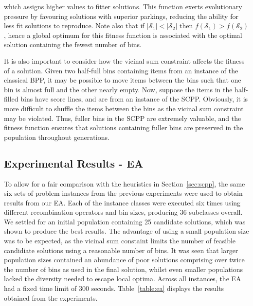 \documentclass[authoryear]{elsarticle}
\begin{document}
\noindent which assigns higher values to fitter solutions. This function exerts evolutionary pressure by favouring solutions with superior parkings, reducing the ability for less fit solutions to reproduce. Note also that if $|\mathcal{S}_1| < |\mathcal{S}_2|$  then $f(\mathcal{S}_1) > f(\mathcal{S}_2)$, hence a global optimum for this fitness function is associated with the optimal solution containing the fewest number of bins.

It is also important to consider how the vicinal sum constraint affects the fitness of a solution. Given two half-full bins containing items from an instance of the classical BPP, it may be possible to move items between the bins such that one bin is almost full and the other nearly empty. Now, suppose the items in the half-filled bins have score lines, and are from an instance of the SCPP. Obviously, it is more difficult to shuffle the items between the bins as the vicinal sum constraint may be violated. Thus, fuller bins in the SCPP are extremely valuable, and the fitness function ensures that solutions containing fuller bins are preserved in the population throughout generations.


\subsection{Experimental Results - EA}
\label{sub:expea}
\noindent To allow for a fair comparison with the heuristics in Section~\ref{sec:scpp}, the same six sets of problem instances from the previous experiments were used to obtain results from our EA. Each of the instance classes were executed six times using different recombination operators and bin sizes, producing 36 subclasses overall. We settled for an initial population containing 25 candidate solutions, which was shown to produce the best results. The advantage of using a small population size was to be expected, as the vicinal sum constaint limits the number of feasible candidiate solutions using a reasonable number of bins. It was seen that larger population sizes contained an abundance of poor solutions comprising over twice the number of bins as used in the final solution, whilst even smaller populations lacked the diversity needed to escape local optima. Across all instances, the EA had a fixed time limit of 300 seconds. Table~\ref{table:ea} displays the results obtained from the experiments.
\end{document}
